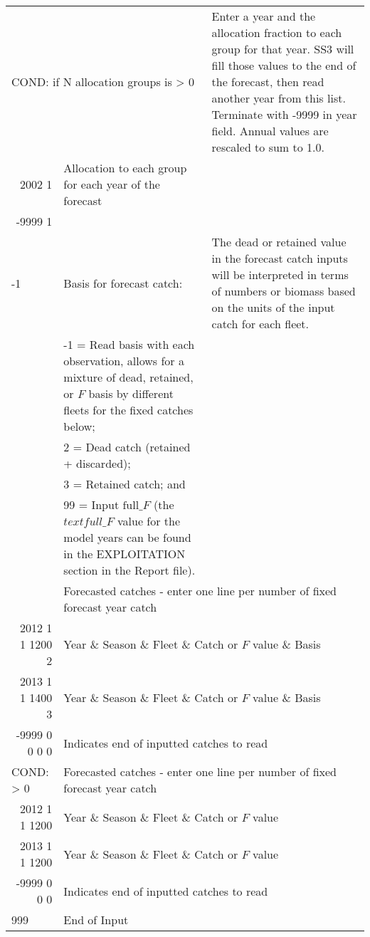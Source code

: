 \begin{landscape}
{\begin{longtable}{p{2cm} p{7cm} p{12cm}}
  \multicolumn{2}{l}{COND: if N allocation groups is > 0} & \multirow{1}{1cm}[-0.25cm]{\parbox{12cm}{Enter a year and the allocation fraction to each group for that year. SS3 will fill those values to the end of the forecast, then read another year from this list. Terminate with -9999 in year field. Annual values are rescaled to sum to 1.0.}} \\
  \multicolumn{1}{r}{2002 1} & Allocation to each group for each year of the forecast & \\
  \multicolumn{1}{r}{-9999 1} & & \Bstrut\\

  \hline
  -1 & Basis for forecast catch: & \multirow{1}{1cm}[-0.25cm]{\parbox{12cm}{The dead or retained value in the forecast catch inputs will be interpreted in terms of numbers or biomass based on the units of the input catch for each fleet.}} \Tstrut\\
    & -1 = Read basis with each observation, allows for a mixture of dead, retained, or $F$ basis by different fleets for the fixed catches below; & \\
    & 2 = Dead catch (retained + discarded); & \\
    & 3 = Retained catch; and & \\
    & 99 = Input $\text{full\_}F$ (the $text{full\_}F$ value for the model years can be found in the EXPLOITATION section in the Report file). & \Bstrut\\
  
  \pagebreak
  \multicolumn{1}{l}{COND: == -1} & \multicolumn{2}{l}{Forecasted catches - enter one line per number of fixed forecast year catch} \Tstrut\\
  \multicolumn{1}{r}{2012 1 1 1200 2} & \multicolumn{2}{l}{Year \& Season \& Fleet \& Catch or $F$ value \& Basis} \\
  \multicolumn{1}{r}{2013 1 1 1400 3} & \multicolumn{2}{l}{Year \& Season \& Fleet \& Catch or $F$ value \& Basis} \\
  \multicolumn{1}{r}{-9999 0 0 0 0} & \multicolumn{2}{l}{Indicates end of inputted catches to read} \Bstrut\\

  \multicolumn{1}{l}{COND: > 0} & \multicolumn{2}{l}{Forecasted catches - enter one line per number of fixed forecast year catch} \Tstrut\\
  \multicolumn{1}{r}{2012 1 1 1200} & \multicolumn{2}{l}{Year \& Season \& Fleet \& Catch or $F$ value} \\
  \multicolumn{1}{r}{2013 1 1 1200} & \multicolumn{2}{l}{Year \& Season \& Fleet \& Catch or $F$ value} \\
  \multicolumn{1}{r}{-9999 0 0 0} & \multicolumn{2}{l}{Indicates end of inputted catches to read} \Bstrut\\

  \hline
  999 & End of Input & \Bstrut\\

  \end{longtable}}
\end{landscape}

